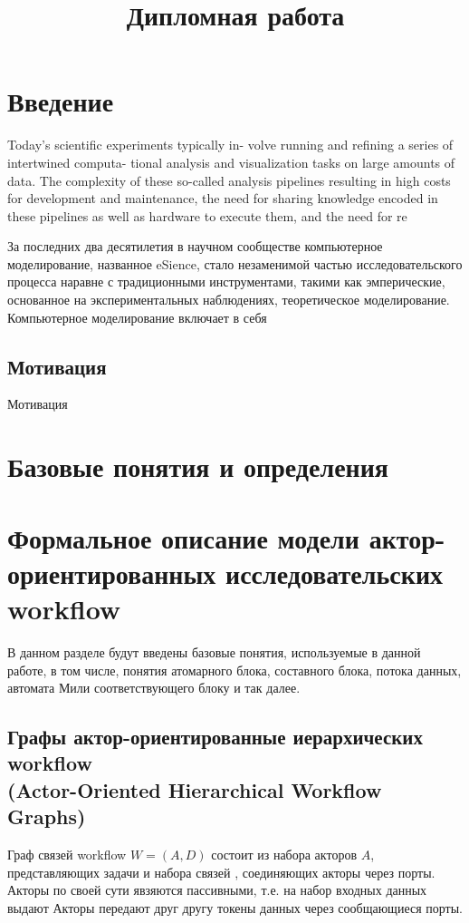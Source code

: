 \documentclass[a4paper,14pt]{article}
\title{Дипломная работа}
\newenvironment{definition}[1]{\begin{trivlist}
\item[\hskip \labelsep {\bfseries #1}]}{\end{trivlist}}
\begin{document}
\maketitle
\textwidth 15.5cm
\topmargin -1cm
\parindent 1cm
\textheight 24cm
\parskip 1.5mm



\section{Введение}

Today’s scientific experiments typically in-
volve running and refining a series of intertwined computa-
tional analysis and visualization tasks on large amounts of
data. The complexity of these so-called analysis pipelines
resulting in high costs for development and maintenance,
the need for sharing knowledge encoded in these pipelines
as well as hardware to execute them, and the need for re


За последних два десятилетия в научном сообществе компьютерное моделирование, названное eSience, стало незаменимой частью исследовательского процесса наравне с традиционными инструментами, такими как эмперические, основанное на  экспериментальных наблюдениях, теоретическое моделирование. Компьютерное моделирование включает в себя 

\subsection{Мотивация}
Мотивация
\section{Базовые понятия и определения}
\section{Формальное описание модели актор-ориентированных исследовательских workflow}
В данном разделе будут введены базовые понятия, используемые в данной работе, в том числе,
понятия атомарного блока, составного блока, потока данных, автомата Мили соответствующего блоку и так далее.
\subsection{Графы актор-ориентированные иерархических workflow\\(Actor-Oriented Hierarchical Workflow Graphs)}

\begin{definition}{Граф связей workflow}
 Граф связей workflow $W =(A, D)$ состоит из набора акторов $A$, представляющих  задачи и набора связей , соединяющих акторы через порты. Акторы по своей сути явзяются пассивными, т.е. на набор входных данных выдают 
 Акторы передают друг другу токены данных через сообщающиеся порты.
\end{definition}
\end{document}
